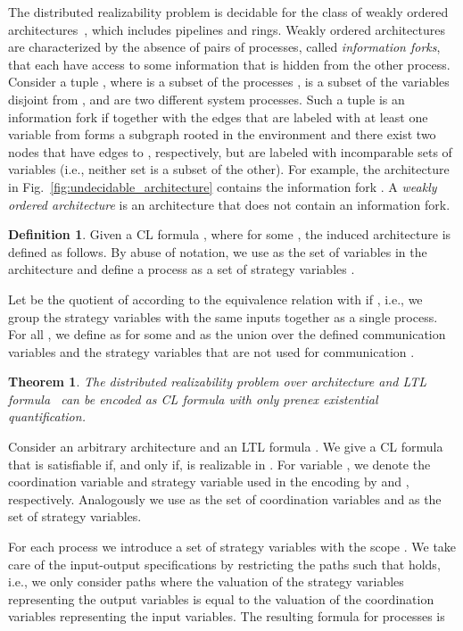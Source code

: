 \documentclass{LMCS}
\theoremstyle{plain}\newtheorem{theorem}[thm]{Theorem}
\theoremstyle{plain}\newtheorem{lemma}[thm]{Lemma}
\theoremstyle{plain}\newtheorem{proposition}[thm]{Proposition}
\theoremstyle{plain}\newtheorem{corollary}[thm]{Corollary}
\theoremstyle{definition}\newtheorem{definition}{Definition}[section]
\begin{document}
The distributed realizability problem is decidable for the class of 
weakly ordered architectures~\cite{DBLP:conf/lics/FinkbeinerS05}, which includes pipelines and rings.
Weakly ordered architectures are characterized by the absence of pairs of processes, called \emph{information forks}, that each have access to some information that is hidden from the other process.
Consider a tuple , where  is a subset of the processes ,  is a subset of the variables disjoint from , and  are two different system processes.
Such a tuple is an information fork if  together with the edges that are
labeled with at least one variable from  forms a subgraph rooted in the
environment and there exist two nodes  that have edges to ,
respectively, but are labeled with incomparable sets of variables (i.e.,
neither set is a subset of the other).
For example, the architecture in Fig.~\ref{fig:undecidable_architecture} contains the information fork .
A \emph{weakly ordered architecture} is an architecture that does not contain an information fork.

\begin{definition} \label{def:induced_architecture}
  Given a CL formula , where  for some , the induced architecture  is defined as follows.
  By abuse of notation, we use  as the set of variables in the architecture and define a process  as a set of strategy variables .
  
  Let  be the quotient of  according to the equivalence relation  with  if , i.e., we group the strategy variables with the same inputs together as a single process.
  For all , we define  as  for some  and  as the union over the defined communication variables  and the strategy variables that are not used for communication .
\end{definition}

\begin{theorem} \label{thm:ecl_encoding_distributed_synthesis}
The distributed realizability problem over architecture  and LTL formula~ can be encoded as CL formula  with only prenex existential quantification.
\end{theorem}
\proof
Consider an arbitrary architecture  and an LTL formula .
We give a CL formula  that is satisfiable if, and only if,  is realizable in .
For variable , we denote the coordination variable and strategy variable used in the encoding by  and , respectively.
Analogously we use  as the set of coordination variables and  as the set of strategy variables.

For each process  we introduce a set of strategy variables  with the scope .
We take care of the input-output specifications by restricting the paths such that  holds, i.e., we only consider paths where the valuation of the strategy variables  representing the output variables is equal to the valuation of the coordination variables  representing the input variables. The resulting formula  for processes  is
\end{document}

